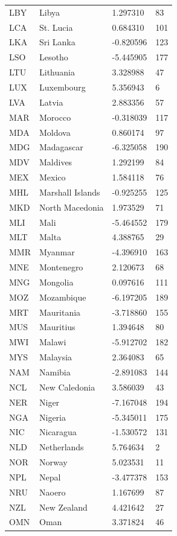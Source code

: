 \begin{tabular}{llll}
LBY & Libya & 1.297310 & 83 \\
LCA & St. Lucia & 0.684310 & 101 \\
LKA & Sri Lanka & -0.820596 & 123 \\
LSO & Lesotho & -5.445905 & 177 \\
LTU & Lithuania & 3.328988 & 47 \\
LUX & Luxembourg & 5.356943 & 6 \\
LVA & Latvia & 2.883356 & 57 \\
MAR & Morocco & -0.318039 & 117 \\
MDA & Moldova & 0.860174 & 97 \\
MDG & Madagascar & -6.325058 & 190 \\
MDV & Maldives & 1.292199 & 84 \\
MEX & Mexico & 1.584118 & 76 \\
MHL & Marshall Islands & -0.925255 & 125 \\
MKD & North Macedonia & 1.973529 & 71 \\
MLI & Mali & -5.464552 & 179 \\
MLT & Malta & 4.388765 & 29 \\
MMR & Myanmar & -4.396910 & 163 \\
MNE & Montenegro & 2.120673 & 68 \\
MNG & Mongolia & 0.097616 & 111 \\
MOZ & Mozambique & -6.197205 & 189 \\
MRT & Mauritania & -3.718860 & 155 \\
MUS & Mauritius & 1.394648 & 80 \\
MWI & Malawi & -5.912702 & 182 \\
MYS & Malaysia & 2.364083 & 65 \\
NAM & Namibia & -2.891083 & 144 \\
NCL & New Caledonia & 3.586039 & 43 \\
NER & Niger & -7.167048 & 194 \\
NGA & Nigeria & -5.345011 & 175 \\
NIC & Nicaragua & -1.530572 & 131 \\
NLD & Netherlands & 5.764634 & 2 \\
NOR & Norway & 5.023531 & 11 \\
NPL & Nepal & -3.477378 & 153 \\
NRU & Naoero & 1.167699 & 87 \\
NZL & New Zealand & 4.421642 & 27 \\
OMN & Oman & 3.371824 & 46 \\

\end{tabular}
